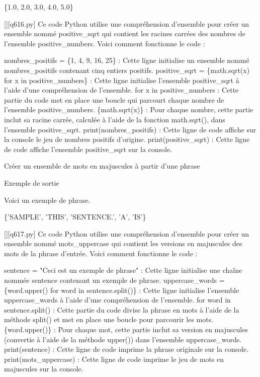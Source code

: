 \{1.0, 2.0, 3.0, 4.0, 5.0\}
        \par
        \begin{solution}
            \renewcommand{\nomfichier}{q616.py}
            \pythonfile{\chemincode \nomfichier}[][\nomfichier]
            Ce code Python utilise une compréhension d'ensemble pour créer un ensemble nommé positive\_sqrt qui contient les racines carrées des nombres de l'ensemble positive\_numbers. Voici comment fonctionne le code :

    nombres\_positifs = \{1, 4, 9, 16, 25\} : Cette ligne initialise un ensemble nommé nombres\_positifs contenant cinq entiers positifs.
    positive\_sqrt = \{math.sqrt(x) for x in positive\_numbers\} : Cette ligne initialise l'ensemble positive\_sqrt à l'aide d'une compréhension de l'ensemble.
        for x in positive\_numbers : Cette partie du code met en place une boucle qui parcourt chaque nombre de l'ensemble positive\_numbers.
        \{math.sqrt(x)\} : Pour chaque nombre, cette partie inclut sa racine carrée, calculée à l'aide de la fonction math.sqrt(), dans l'ensemble positive\_sqrt.
    print(nombres\_positifs) : Cette ligne de code affiche sur la console le jeu de nombres positifs d'origine.
    print(positive\_sqrt) : Cette ligne de code affiche l'ensemble positive\_sqrt sur la console.
        \end{solution}
        

        \question
        Créer un ensemble de mots en majuscules à partir d'une phrase

Exemple de sortie

Voici un exemple de phrase.

\{'SAMPLE', 'THIS', 'SENTENCE.', 'A', 'IS'\}
        \par
        \begin{solution}
            \renewcommand{\nomfichier}{q617.py}
            \pythonfile{\chemincode \nomfichier}[][\nomfichier]
            Ce code Python utilise une compréhension d'ensemble pour créer un ensemble nommé mots\_uppercase qui contient les versions en majuscules des mots de la phrase d'entrée. Voici comment fonctionne le code :

    sentence = "Ceci est un exemple de phrase" : Cette ligne initialise une chaîne nommée sentence contenant un exemple de phrase.
    uppercase\_words = \{word.upper() for word in sentence.split()\} : Cette ligne initialise l'ensemble uppercase\_words à l'aide d'une compréhension de l'ensemble.
        for word in sentence.split() : Cette partie du code divise la phrase en mots à l'aide de la méthode split() et met en place une boucle pour parcourir les mots.
        \{word.upper()\} : Pour chaque mot, cette partie inclut sa version en majuscules (convertie à l'aide de la méthode upper()) dans l'ensemble uppercase\_words.
    print(sentence) : Cette ligne de code imprime la phrase originale sur la console.
    print(mots\_uppercase) : Cette ligne de code imprime le jeu de mots en majuscules sur la console.
        \end{solution}
        

